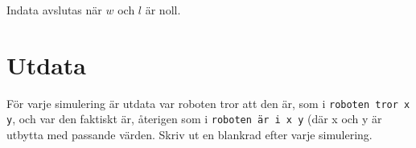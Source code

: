 Indata avslutas när $w$ och $l$ är noll.

\section*{Utdata}

För varje simulering är utdata var roboten tror att den är, som i 
{\tt roboten tror x y}, och var den faktiskt är, återigen som i
{\tt roboten är i x y} (där x och y är utbytta med passande värden.
Skriv ut en blankrad efter varje simulering.
